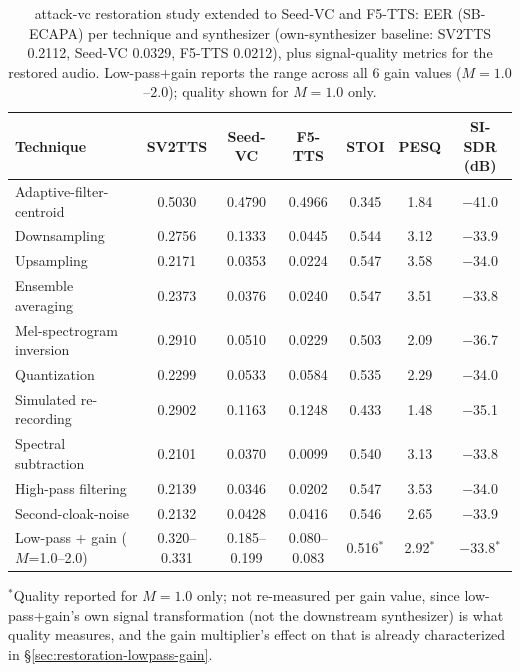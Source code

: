 \documentclass[11pt]{article}
\begin{document}
\begin{table}[H]
\centering
\caption{attack-vc restoration study extended to Seed-VC and F5-TTS:
EER (SB-ECAPA) per technique and synthesizer (own-synthesizer baseline:
SV2TTS 0.2112, Seed-VC 0.0329, F5-TTS 0.0212), plus signal-quality
metrics for the restored audio. Low-pass+gain reports the range across
all 6 gain values ($M=1.0$--$2.0$); quality shown for $M=1.0$ only.}
\label{tab:restoration-attackvc-seedvc-f5tts}
\begin{tabular}{lcccccc}
\toprule
Technique & SV2TTS & Seed-VC & F5-TTS & STOI & PESQ & SI-SDR (dB) \\
\midrule
Adaptive-filter-centroid  & 0.5030 & 0.4790 & 0.4966 & 0.345 & 1.84 & $-$41.0 \\
Downsampling              & 0.2756 & 0.1333 & 0.0445 & 0.544 & 3.12 & $-$33.9 \\
Upsampling                & 0.2171 & 0.0353 & 0.0224 & 0.547 & 3.58 & $-$34.0 \\
Ensemble averaging        & 0.2373 & 0.0376 & 0.0240 & 0.547 & 3.51 & $-$33.8 \\
Mel-spectrogram inversion & 0.2910 & 0.0510 & 0.0229 & 0.503 & 2.09 & $-$36.7 \\
Quantization              & 0.2299 & 0.0533 & 0.0584 & 0.535 & 2.29 & $-$34.0 \\
Simulated re-recording    & 0.2902 & 0.1163 & 0.1248 & 0.433 & 1.48 & $-$35.1 \\
Spectral subtraction      & 0.2101 & 0.0370 & 0.0099 & 0.540 & 3.13 & $-$33.8 \\
High-pass filtering       & 0.2139 & 0.0346 & 0.0202 & 0.547 & 3.53 & $-$34.0 \\
Second-cloak-noise        & 0.2132 & 0.0428 & 0.0416 & 0.546 & 2.65 & $-$33.9 \\
Low-pass + gain ($M$=1.0--2.0) & 0.320--0.331 & 0.185--0.199 & 0.080--0.083 & 0.516$^{\ast}$ & 2.92$^{\ast}$ & $-$33.8$^{\ast}$ \\
\bottomrule
\end{tabular}

{\small $^{\ast}$Quality reported for $M=1.0$ only; not re-measured per
gain value, since low-pass+gain's own signal transformation (not the
downstream synthesizer) is what quality measures, and the gain
multiplier's effect on that is already characterized in
\S\ref{sec:restoration-lowpass-gain}.}
\end{table}
\end{document}

